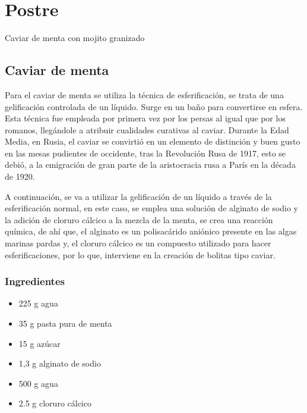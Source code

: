 \documentclass{scrartcl}
\newcommand{\msection}[2]{\section{#1}{\color{Maroon}\fontspec{Zapfino.ttf}\begin{center}#2\end{center}}}
\begin{document}
	\newpage
	\msection{Postre}{Caviar de menta con mojito granizado}
	\subsection{Caviar de menta}
	Para el caviar de menta se utiliza la técnica de esferificación, se trata de una gelificación controlada de un líquido. Surge en un baño para convertirse en esfera. Esta técnica fue empleada por primera vez por los persas al igual que por los romanos, llegándole a atribuir cualidades curativas al caviar. Durante la Edad Media, en Rusia, el caviar se convirtió en un elemento de distinción y buen gusto en las mesas pudientes de occidente, tras la Revolución Rusa de 1917, esto se debió, a la emigración de gran parte de la aristocracia rusa a París en la década de 1920. \cite{davidson2014oxford}
	
	A continuación, se va a utilizar la gelificación de un líquido a través de la esferificación normal, en este caso, se emplea una solución de alginato de sodio y la adición de cloruro cálcico a la mezcla de la menta, se crea una reacción química, de ahí que, el alginato es un polisacárido aniónico presente en las algas marinas pardas y, el cloruro cálcico es un compuesto utilizado para hacer esferificaciones, por lo que, interviene en la creación de bolitas tipo caviar.
	
	\subsubsection{Ingredientes}
		\begin{multicols}{2}
			\begin{itemize}
				\item 225 g agua 
				\item 35 g pasta pura de menta 
				\item 15 g azúcar 
				\item 1,3 g alginato de sodio
				\item 500 g agua 
				\item 2.5 g cloruro cálcico 
			\end{itemize}
		\end{multicols}
	
\end{document}
